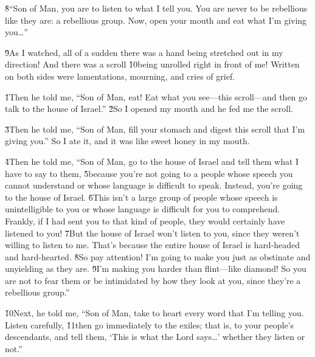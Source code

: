 \v{8}``Son of Man, you are to listen to what I tell you. You are never to be rebellious like they are: a rebellious group. Now, open your mouth and eat what I'm giving you{\ldots}''

\v{9}As I watched, all of a sudden there was a hand being stretched out in my direction! And there was a scroll \v{10}being unrolled right in front of me! Written on both sides were lamentations, mourning, and cries of grief.

\v{1}Then he told me, ``Son of Man, eat! Eat what you see---this scroll---and then go talk to the house of Israel.'' \v{2}So I opened my mouth and he fed me the scroll.

\v{3}Then he told me, ``Son of Man, fill your stomach and digest this scroll that I'm giving you.'' So I ate it, and it was like sweet honey in my mouth.

\v{4}Then he told me, ``Son of Man, go to the house of Israel and tell them what I have to say to them, \v{5}because you're not going to a people whose speech you cannot understand or whose language is difficult to speak. Instead, you're going to the house of Israel. \v{6}This isn't a large group of people whose speech is unintelligible to you or whose language is difficult for you to comprehend. Frankly, if I had sent you to that kind of people, they would certainly have listened to you! \v{7}But the house of Israel won't listen to you, since they weren't willing to listen to me. That's because the entire house of Israel is hard-headed and hard-hearted. \v{8}So pay attention! I'm going to make you just as obstinate and unyielding as they are. \v{9}I'm making you harder than flint---like diamond! So you are not to fear them or be intimidated by how they look at you, since they're a rebellious group.''

\v{10}Next, he told me, ``Son of Man, take to heart every word that I'm telling you. Listen carefully, \v{11}then go immediately to the exiles; that is, to your people's descendants, and tell them, `This is what the Lord  says{\ldots}' whether they listen or not.''

